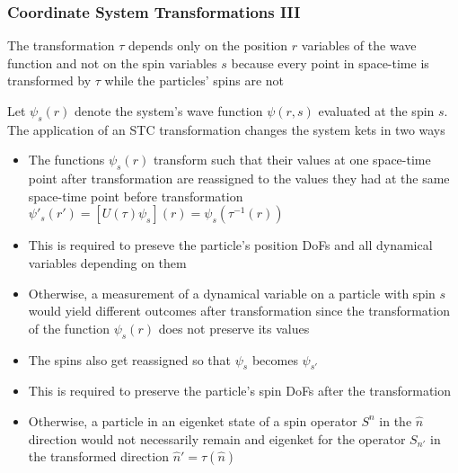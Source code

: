 \documentclass[8pt,t,mathserif,aspectratio=169]{beamer}
\begin{document}
\begin{frame}
  \frametitle{Coordinate System Transformations III}
  \vspace{1mm}
  The transformation $\tau$ depends only on the position $r$ variables of the wave function and not on the spin variables $s$ because every point in space-time is transformed by $\tau$ while the particles' spins are not

  Let $\psi_s(r)$ denote the system's wave function $\psi(r,s)$ evaluated at the spin $s$. The application of an STC transformation changes the system kets in two ways
  \begin{itemize}
    \item The functions $\psi_s(r)$ transform such that their values at one space-time point after transformation are reassigned to the values they had at the same space-time point before transformation $\psi'_s(r') = [U(\tau) \psi_s](r) = \psi_s(\tau^{-1}(r))$
    \item This is required to preseve the particle's position DoFs and all dynamical variables depending on them
    \item Otherwise, a measurement of a dynamical variable on a particle with spin $s$ would yield different outcomes after transformation since the transformation of the function $\psi_s(r)$ does not preserve its values
    \item The spins also get reassigned so that $\psi_s$ becomes $\psi_{s'}$
    \item This is required to preserve the particle's spin DoFs after the transformation 
    \item Otherwise, a particle in an eigenket state of a spin operator $S^n$ in the $\hat{n}$ direction would not necessarily remain and eigenket for the operator $S_{n'}$ in the transformed direction $\hat{n}' = \tau(\hat{n})$
  \end{itemize}
\end{frame}
\end{document}

